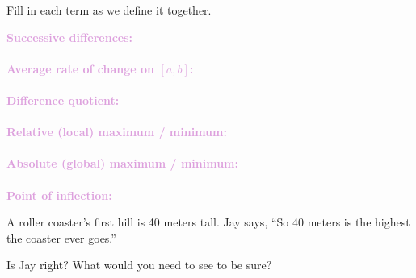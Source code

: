 \documentclass[10pt]{article}
\begin{document}

\vspace{0.12in}

\boxguard
\begin{vocabbox}
Fill in each term as we define it together.
\par\vspace{2pt}
\noindent\textbf{\textcolor{plum}{Successive differences:}}\\[1pt]
\writeline\\[3pt]
\noindent\textbf{\textcolor{plum}{Average rate of change on $[a, b]$:}}\\[1pt]
\writeline\\[3pt]
\noindent\textbf{\textcolor{plum}{Difference quotient:}}\\[1pt]
\writeline\\[3pt]
\noindent\textbf{\textcolor{plum}{Relative (local) maximum / minimum:}}\\[1pt]
\writeline\\[3pt]
\noindent\textbf{\textcolor{plum}{Absolute (global) maximum / minimum:}}\\[1pt]
\writeline\\[3pt]
\noindent\textbf{\textcolor{plum}{Point of inflection:}}\\[1pt]
\writeline
\end{vocabbox}

\vspace{0.1in}

\boxguard
\begin{hookbox}
A roller coaster's first hill is 40 meters tall. Jay says, ``So 40 meters is the highest the
coaster ever goes.''

Is Jay right? What would you need to see to be sure?
\end{hookbox}
\end{document}
